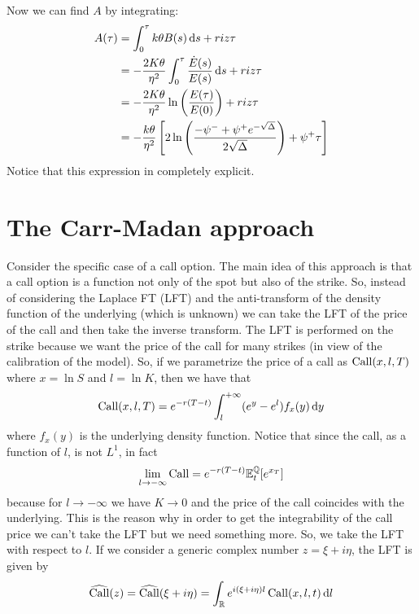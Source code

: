 Now we can find $A$ by integrating:
\begin{align}
    \notag A(\tau) &= \int_0^{\tau} k\theta B(s)\,\dd s + riz\tau \\
    &=
    \notag -\frac{2K\theta}{\eta^2} \int_0^{\tau} \frac{\dot{E}(s)}{E(s)}\,\dd s + riz\tau \\
    &=
    \notag -\frac{2K\theta}{\eta^2}\ln\left(\frac{E(\tau)}{E(0)}\right) + riz\tau \\
    &=
    -\frac{k\theta}{\eta^2}\left[2\ln\left(\frac{-\psi^- + \psi^+ e^{-\sqrt{\Delta}}}{2\sqrt{\Delta}}\right) + \psi^+\tau \right]
\end{align} %
Notice that this expression in completely explicit.

\section{The Carr-Madan approach}
Consider the specific case of a call option. The main idea of this approach is that a call option is a function not only of the spot but also of the strike. So, instead of considering the Laplace FT (LFT) and the anti-transform of the density function of the underlying (which is unknown) we can take the LFT of the price of the call and then take the inverse transform. The LFT is performed on the strike because we want the price of the call for many strikes (in view of the calibration of the model). So, if we parametrize the price of a call as $\operatorname{Call}(x,l,T)$ where $x = \ln S$ and $l = \ln K$, then we have that
\begin{equation}
    \operatorname{Call}(x,l,T) = e^{-r(T-t)}\int_{l}^{+\infty} (e^y - e^l)f_x(y)\,\dd y
\end{equation}
where $f_x(y)$ is the underlying density function. Notice that since the call, as a function of $l$, is not $L^1$, in fact
\begin{equation*}
    \lim_{l\to-\infty}\operatorname{Call} = e^{-r(T-t)}\mathbb{E}^{\mathbb{Q}}_t[e^{x_T}]
\end{equation*}
because for $l\to-\infty$ we have $K\to0$ and the price of the call coincides with the underlying. This is the reason why in order to get the integrability of the call price we can't take the LFT but we need something more. So, we take the LFT with respect to $l$. If we consider a generic complex number $z = \xi + i\eta$, the LFT is given by
\begin{equation*}
    \widehat{\operatorname{Call}}(z) = \widehat{\operatorname{Call}}(\xi+i\eta) = \int_\mathbb{R} e^{i(\xi+i\eta)l}\operatorname{Call}(x,l,t)\,\dd l
\end{equation*}
